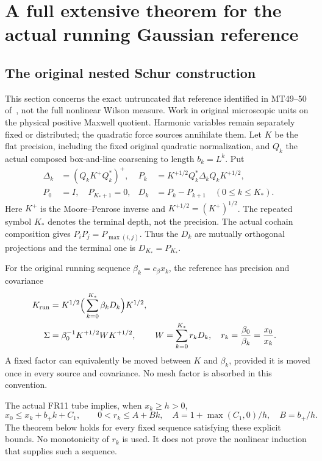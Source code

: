 \documentclass[11pt,letterpaper]{article}
\theoremstyle{remark}\newtheorem{remark}[theorem]{Remark}
\newcommand{\cB}{c_\beta}\newcommand{\dd}{\,d}
\begin{document}
\section{A full extensive theorem for the actual running Gaussian reference}

\subsection{The original nested Schur construction}

This section concerns the exact untruncated flat reference identified in MT49--50 of~\cite[p.~697]{W}, not the full nonlinear Wilson measure. Work in original microscopic units on the physical positive Maxwell quotient. Harmonic variables remain separately fixed or distributed; the quadratic force sources annihilate them. Let \(K\) be the flat precision, including the fixed original quadratic normalization, and \(Q_k\) the actual composed box-and-line coarsening to length \(b_k=L^k\). Put
\begin{align}\label{eq:projections}
 \Delta_k&=(Q_kK^+Q_k^*)^+,
 &P_k&=K^{+1/2}Q_k^*\Delta_kQ_kK^{+1/2},\\
 P_0&=I,\quad P_{K_*+1}=0,
 &D_k&=P_k-P_{k+1}\quad(0\le k\le K_*).
 \nonumber
\end{align}
Here \(K^+\) is the Moore--Penrose inverse and \(K^{+1/2}=(K^+)^{1/2}\). The repeated symbol \(K_*\) denotes the terminal depth, not the precision. The actual cochain composition gives \(P_iP_j=P_{\max(i,j)}\). Thus the \(D_k\) are mutually orthogonal projections and the terminal one is \(D_{K_*}=P_{K_*}\).

For the original running sequence \(\beta_k=\cB x_k\), the reference has precision and covariance
\begin{align}\label{eq:running}
 K_{\rm run}&=K^{1/2}\Big(\sum_{k=0}^{K_*}\beta_kD_k\Big)K^{1/2},\\
 \Sigma&=\beta_0^{-1}K^{+1/2}WK^{+1/2},
 &W&=\sum_{k=0}^{K_*}r_kD_k,
 \quad r_k=\frac{\beta_0}{\beta_k}=\frac{x_0}{x_k}.\nonumber
\end{align}
A fixed factor can equivalently be moved between \(K\) and \(\beta_k\), provided it is moved once in every source and covariance. No mesh factor is absorbed in this convention.

The actual FR11 tube implies, when \(x_k\ge h>0\),
\begin{equation}\label{eq:tube}
 x_0\le x_k+b_+k+C_1,
 \qquad 0<r_k\le A+Bk,
 \quad A=1+\max(C_1,0)/h,\quad B=b_+/h.
\end{equation}
The theorem below holds for every fixed sequence satisfying these explicit bounds. No monotonicity of \(r_k\) is used. It does not prove the nonlinear induction that supplies such a sequence.
\end{document}
